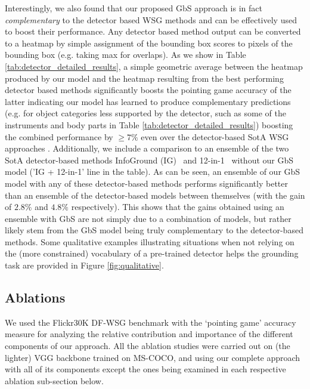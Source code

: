 \documentclass[10pt,twocolumn,letterpaper]{article}
\def\oursspace{{GbS }}
\def\ourstask{DF-WSG}
\newcommand\secvspace{\vspace{-0.0cm}}
\begin{document}
Interestingly, we also found that our proposed \oursspace approach is in fact \textit{complementary} to the detector based WSG methods and can be effectively used to boost their performance. Any detector based method output can be converted to a heatmap by simple assignment of the bounding box scores to pixels of the bounding box (e.g. taking max for overlaps). As we show in Table \ref{tab:detector_detailed_results}, a simple geometric average between the heatmap produced by our model and the heatmap resulting from the best performing detector based methods significantly boosts the pointing game accuracy of the latter indicating our model has learned to produce complementary predictions (e.g. for object categories less supported by the detector, such as some of the instruments and body parts in Table \ref{tab:detector_detailed_results}) boosting the combined performance by $\ge 7\%$ even over the detector-based SotA WSG approaches \cite{datta2019align2ground, gupta2020contrastive,lu202012}. 
Additionally, we include a comparison to an ensemble of the two SotA detector-based methods InfoGround (IG)~\cite{gupta2020contrastive} and 12-in-1~\cite{lu202012} without our \oursspace model ('IG + 12-in-1' line in the table). As can be seen, an ensemble of our \oursspace model with any of these detector-based methods performs significantly better than an ensemble of the detector-based models between themselves (with the gain of $2.8\%$ and $4.8\%$ respectively). This shows that the gains obtained using an ensemble with \oursspace are not simply due to a combination of models, but rather likely stem from the \oursspace model being truly complementary to the detector-based methods.
Some qualitative examples illustrating situations when not relying on the (more constrained) vocabulary of a pre-trained detector helps the grounding task are provided in Figure \ref{fig:qualitative}. \secvspace
\subsection{Ablations}\label{sec:ablations}
\secvspace
We used the Flickr30K \ourstask{} benchmark \cite{plummer2015flickr30k} with the `pointing game' accuracy measure \cite{zhang2016top} for analyzing the relative contribution and importance of the different components of our \ours{} approach. All the ablation studies were carried out on (the lighter) VGG backbone trained on MS-COCO, and using our complete \ours{} approach with all of its components except the ones being examined in each respective ablation sub-section below.
\end{document}
